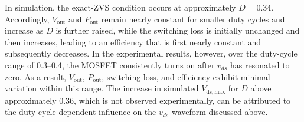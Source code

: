 \documentclass[journal, 9pt, letterpaper, english]{IEEEtran}[2015/08/26]
\begin{document}
In simulation, the exact-ZVS condition occurs at approximately $D = 0.34$.
Accordingly, $V_{\mathrm{out}}$ and $P_{\mathrm{out}}$ remain nearly constant for smaller duty cycles and increase as $D$ is further raised, while the switching loss is initially unchanged and then increases, leading to an efficiency that is first nearly constant and subsequently decreases.
In the experimental results, however, over the duty-cycle range of \numrange{0.3}{0.4}, the MOSFET consistently turns on after $v_{ds}$ has resonated to zero. As a result, $V_{\mathrm{out}}$, $P_{\mathrm{out}}$, switching loss, and efficiency exhibit minimal variation within this range.
The increase in simulated $V_{\mathrm{ds,max}}$ for $D$ above approximately 0.36, which is not observed experimentally, can be attributed to the duty-cycle-dependent influence on the $v_{ds}$ waveform discussed above.
\end{document}
